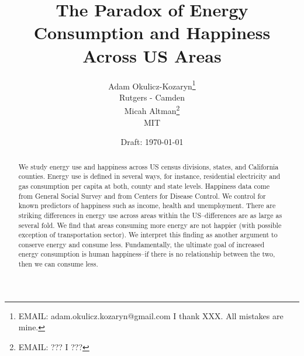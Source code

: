 \documentclass[10pt, letterpaper]{article}
\date{Draft: {}\today}
\title{
  The Paradox of Energy Consumption and Happiness Across US Areas
}
\author{
Adam Okulicz-Kozaryn\thanks{EMAIL: adam.okulicz.kozaryn@gmail.com
  \hfill I thank XXX.  All mistakes are mine.} \\
{\small Rutgers - Camden}\\
Micah Altman\thanks{EMAIL: ???
  \hfill I ???} \\
{\small MIT}
}
\begin{document}


\maketitle
\vspace{-.4in}
\begin{center}

\end{center}

\begin{abstract}
\noindent We study energy use and happiness across US census divisions, states,
and California counties.  Energy
use is defined in several ways, for instance,  residential electricity and gas consumption per capita at both,
county and state levels. Happiness data come
 from General Social Survey and from Centers for Disease Control. We control for known predictors of happiness
such as income, health and unemployment. There are striking differences in
energy use across areas within the US--differences are as large as several
fold. We find that areas consuming more energy are not happier (with possible
exception of transportation sector).
 We interpret this finding as another argument to conserve energy and consume
 less. Fundamentally, the ultimate goal of increased energy consumption is human
 happiness--if there is no relationship between the two, then we can
 consume less.
\end{abstract}
\vspace{.15in} 
\end{document}
